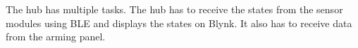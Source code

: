 The hub has multiple tasks. The hub has to receive the states from the sensor modules using BLE and displays the states on Blynk. It also has to receive data from the arming panel. 